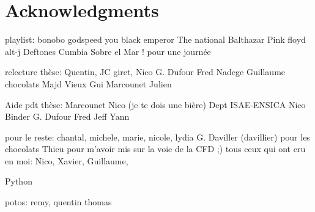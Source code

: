 
\chapter*{Acknowledgments}
\thispagestyle{empty}

playlist:
bonobo
godspeed you black emperor
The national
Balthazar
Pink floyd
alt-j
Deftones
Cumbia Sobre el Mar ! pour une journée

relecture thèse:
Quentin,
JC giret,
Nico
G. Dufour
Fred
Nadege
Guillaume chocolats
Majd
Vieux Gui
Marcounet
Julien

Aide pdt thèse:
Marcounet
Nico (je te dois une bière)
Dept ISAE-ENSICA
Nico Binder
G. Dufour
Fred
Jeff
Yann

pour le reste:
chantal, michele, marie, nicole, lydia
G. Daviller (davillier) pour les chocolats
Thieu pour m'avoir mis sur la voie de la CFD ;)
tous ceux qui ont cru en moi: Nico, Xavier, Guillaume, 

Python 

potos:
remy, quentin thomas